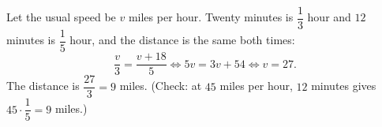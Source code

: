 Let the usual speed be $v$ miles per hour. Twenty minutes is $\dfrac13$ hour and $12$ minutes is $\dfrac15$ hour, and the distance is the same both times:
\[\dfrac v3=\dfrac{v+18}{5}\iff5v=3v+54\iff v=27.\]
The distance is $\dfrac{27}{3}=\boxed{9}$ miles. (Check: at $45$ miles per hour, $12$ minutes gives $45\cdot\dfrac15=9$ miles.)
